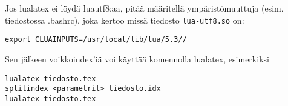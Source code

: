 \documentclass[12pt]{article}
\begin{document}
Jos lualatex ei löydä luautf8:aa, pitää määritellä ympäristömuuttuja
(esim. tiedostossa .bashrc), joka kertoo missä tiedosto
\verb=lua-utf8.so= on:

\verb|export CLUAINPUTS=/usr/local/lib/lua/5.3//|

Sen jälkeen voikkoindex'iä voi käyttää komennolla lualatex, esimerkiksi

\begin{verbatim}
lualatex tiedosto.tex
splitindex <parametrit> tiedosto.idx
lualatex tiedosto.tex
\end{verbatim}


\newpage \printindex[nimet]
\newpage \printindex[paikat]
\newpage \printindex[sanat]
\end{document}
